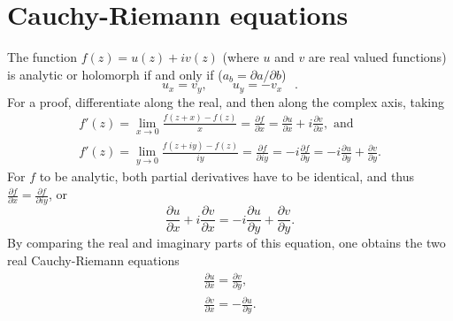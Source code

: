  \section{Cauchy-Riemann equations}
 The function $f(z)=u(z)+iv(z)$ (where $u$ and $v$ are real valued functions) is
 {analytic or holomorph} if and only if
 ($a_b=\partial a/\partial b$)
 \begin{equation}
u_x=v_y, \qquad u_y=-v_x\quad .
\end{equation}
{\color{OliveGreen}
\bproof
For a proof, differentiate along the real, and then along the complex axis,
taking
\begin{equation}
\begin{array}  {l}
f'(z) =\lim_{x\rightarrow 0}\frac{f(z+x)-f(z)}{x}=\frac{\partial f}{\partial x}=   \frac{\partial u}{\partial x}+i\frac{\partial v}{\partial x},\textrm { and}\\
f'(z) =\lim_{y\rightarrow 0}\frac{f(z+iy)-f(z)}{iy}=\frac{\partial f}{\partial iy}= -i\frac{\partial f}{\partial y}=   -i\frac{\partial u}{\partial y}+ \frac{\partial v}{\partial y}.
\end{array}
\end{equation}
For $f$ to be analytic, both partial derivatives have to be identical, and thus $\frac{\partial f}{\partial x}=\frac{\partial f}{\partial iy}$, or
\begin{equation}
\frac{\partial u}{\partial x}+i\frac{\partial v}{\partial x}=   -i\frac{\partial u}{\partial y}+ \frac{\partial v}{\partial y}.
\end{equation}
By comparing the real and imaginary parts of this equation, one obtains the two real Cauchy-Riemann equations
\begin{equation}
\begin{array}  {l}
\frac{\partial u}{\partial x}=   \frac{\partial v}{\partial y},\\
\frac{\partial v}{\partial x}=   -\frac{\partial u}{\partial y}.
\end{array}
\end{equation}
\eproof
}

